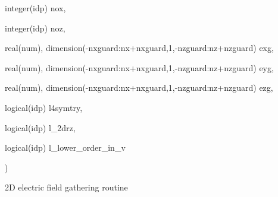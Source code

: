 {\begin{DoxyParamCaption}
\item[{integer(idp)}]{nox, }
\item[{integer(idp)}]{noz, }
\item[{real(num), dimension(-\/nxguard\+:nx+nxguard,1,-\/nzguard\+:nz+nzguard)}]{exg, }
\item[{real(num), dimension(-\/nxguard\+:nx+nxguard,1,-\/nzguard\+:nz+nzguard)}]{eyg, }
\item[{real(num), dimension(-\/nxguard\+:nx+nxguard,1,-\/nzguard\+:nz+nzguard)}]{ezg, }
\item[{logical(idp)}]{l4symtry, }
\item[{logical(idp)}]{l\+\_\+2drz, }
\item[{logical(idp)}]{l\+\_\+lower\+\_\+order\+\_\+in\+\_\+v}
\end{DoxyParamCaption}
)}\hypertarget{field__gathering__2d_8_f90_ab93a0f4d8c25f1ff4ec81319daea39e2}{}\label{field__gathering__2d_8_f90_ab93a0f4d8c25f1ff4ec81319daea39e2}


2D electric field gathering routine 

